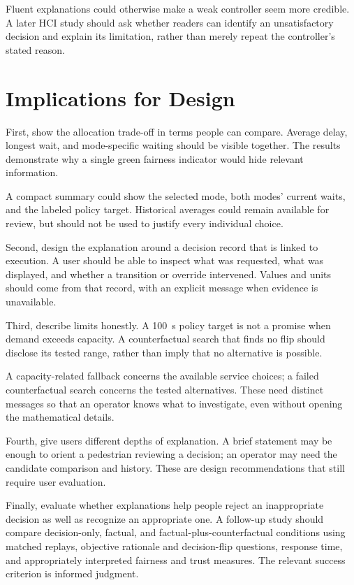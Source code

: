 \documentclass[sigconf]{acmart}
\begin{document}
Fluent explanations could otherwise make a weak controller seem
more credible. A later HCI study should ask whether readers can
identify an unsatisfactory decision and explain its limitation,
rather than merely repeat the controller's stated reason.

\section{Implications for Design}
First, show the allocation trade-off in terms people can compare.
Average delay, longest wait, and mode-specific waiting should be
visible together. The results demonstrate why a single green
fairness indicator would hide relevant information.

A compact summary could show the selected mode, both modes'
current waits, and the labeled policy target. Historical averages
could remain available for review, but should not be used to
justify every individual choice.

Second, design the explanation around a decision record that is
linked to execution. A user should be able to inspect what was
requested, what was displayed, and whether a transition or
override intervened. Values and units should come from that
record, with an explicit message when evidence is unavailable.

Third, describe limits honestly. A 100~s policy target is not a
promise when demand exceeds capacity. A counterfactual search
that finds no flip should disclose its tested range, rather than
imply that no alternative is possible.

A capacity-related fallback concerns the available service choices;
a failed counterfactual search concerns the tested alternatives.
These need distinct messages so that an operator knows what to
investigate, even without opening the mathematical details.

Fourth, give users different depths of explanation. A brief
statement may be enough to orient a pedestrian reviewing a
decision; an operator may need the candidate comparison and
history. These are design recommendations that still require
user evaluation.

Finally, evaluate whether explanations help people reject an
inappropriate decision as well as recognize an appropriate one.
A follow-up study should compare decision-only, factual, and
factual-plus-counterfactual conditions using matched replays,
objective rationale and decision-flip questions, response time,
and appropriately interpreted fairness and trust measures.
The relevant success criterion is informed judgment.
\end{document}
